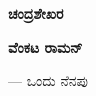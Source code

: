 \thispagestyle{empty}

\begin{center}
{\Huge\bfseries ಚಂದ್ರಶೇಖರ}
\bigskip

{\Huge\bfseries ವೆಂಕಟ ರಾಮನ್}

\bigskip
{\Large — ಒಂದು ನೆನಪು}
\end{center}
\vfill
\eject
